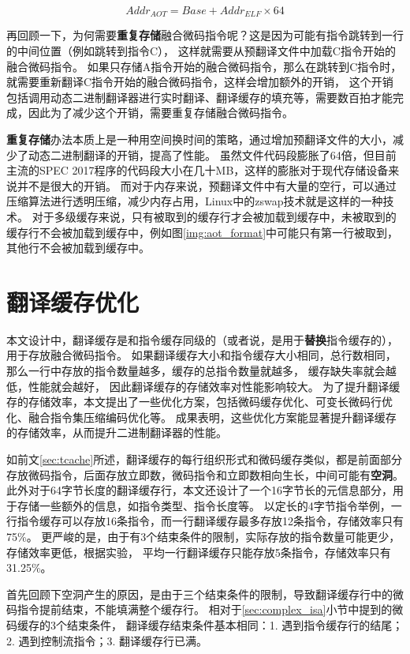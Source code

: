 \begin{equation}
Addr_{AOT} = Base +  Addr_{ELF} \times 64 
\end{equation}

再回顾一下，为何需要\textbf{重复存储}融合微码指令呢？这是因为可能有指令跳转到一行的中间位置（例如跳转到指令C），
这样就需要从预翻译文件中加载C指令开始的融合微码指令。
如果只存储A指令开始的融合微码指令，那么在跳转到C指令时，就需要重新翻译C指令开始的融合微码指令，这样会增加额外的开销，
这个开销包括调用动态二进制翻译器进行实时翻译、翻译缓存的填充等，需要数百拍才能完成，因此为了减少这个开销，需要重复存储融合微码指令。


\textbf{重复存储}办法本质上是一种用空间换时间的策略，通过增加预翻译文件的大小，减少了动态二进制翻译的开销，提高了性能。
虽然文件代码段膨胀了64倍，但目前主流的SPEC 2017程序的代码段大小在几十MB，这样的膨胀对于现代存储设备来说并不是很大的开销。
而对于内存来说，预翻译文件中有大量的空行，可以通过压缩算法进行透明压缩，减少内存占用，Linux中的zswap技术就是这样的一种技术。
对于多级缓存来说，只有被取到的缓存行才会被加载到缓存中，未被取到的缓存行不会被加载到缓存中，例如图\ref{img:aot_format}中可能只有第一行被取到，其他行不会被加载到缓存中。


\section{翻译缓存优化}

本文设计中，翻译缓存是和指令缓存同级的（或者说，是用于\textbf{替换}指令缓存的），用于存放融合微码指令。
如果翻译缓存大小和指令缓存大小相同，总行数相同，那么一行中存放的指令数量越多，缓存的总指令数量就越多，
缓存缺失率就会越低，性能就会越好，
因此翻译缓存的存储效率对性能影响较大。
为了提升翻译缓存的存储效率，本文提出了一些优化方案，包括微码缓存优化、可变长微码行优化、融合指令集压缩编码优化等。
成果表明，这些优化方案能显著提升翻译缓存的存储效率，从而提升二进制翻译器的性能。

如前文\ref{sec:tcache}所述，翻译缓存的每行组织形式和微码缓存类似，都是前面部分存放微码指令，后面存放立即数，微码指令和立即数相向生长，中间可能有\textbf{空洞}。
此外对于64字节长度的翻译缓存行，本文还设计了一个16字节长的元信息部分，用于存储一些额外的信息，如指令类型、指令长度等。
以定长的4字节指令举例，一行指令缓存可以存放16条指令，而一行翻译缓存最多存放12条指令，存储效率只有75\%。
更严峻的是，由于有3个结束条件的限制，实际存放的指令数量可能更少，存储效率更低，根据实验，
平均一行翻译缓存只能存放5条指令，存储效率只有31.25\%。

首先回顾下空洞产生的原因，是由于三个结束条件的限制，导致翻译缓存行中的微码指令提前结束，不能填满整个缓存行。
相对于\ref{sec:complex_isa}小节中提到的微码缓存的3个结束条件，
翻译缓存结束条件基本相同：1. 遇到指令缓存行的结尾；2. 遇到控制流指令；3. 翻译缓存行已满。


